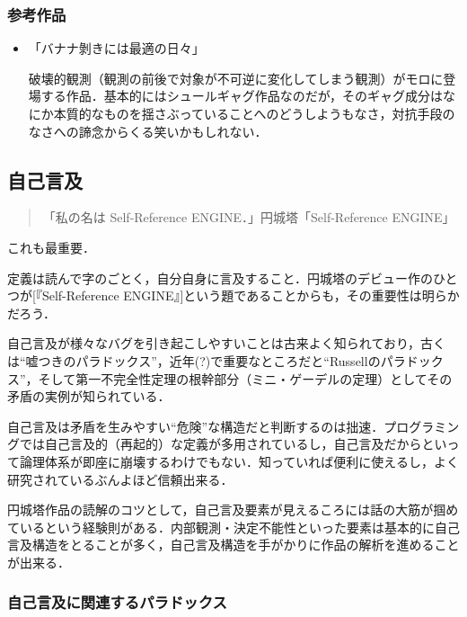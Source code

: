 \documentclass[10pt, a5paper, twoside]{jsarticle}
\begin{document}
			\subsubsection*{参考作品}
			
			\begin{itemize}
				
				\item「バナナ剝きには最適の日々」

					破壊的観測（観測の前後で対象が不可逆に変化してしまう観測）がモロに登場する作品．基本的にはシュールギャグ作品なのだが，そのギャグ成分はなにか本質的なものを揺さぶっていることへのどうしようもなさ，対抗手段のなさへの諦念からくる笑いかもしれない．

			\end{itemize}

		\subsection{自己言及}

			\begin{quote}

				「私の名は Self-Reference ENGINE．」\hspace{\fill}円城塔「Self-Reference ENGINE」

			\end{quote}

			これも最重要．

			定義は読んで字のごとく，自分自身に言及すること．円城塔のデビュー作のひとつが[『Self-Reference ENGINE』]という題であることからも，その重要性は明らかだろう．
			
			自己言及が様々なバグを引き起こしやすいことは古来よく知られており，古くは“嘘つきのパラドックス”，近年(?)で重要なところだと“Russellのパラドックス”，そして第一不完全性定理の根幹部分（ミニ・ゲーデルの定理）としてその矛盾の実例が知られている．

			自己言及は矛盾を生みやすい“危険”な構造だと判断するのは拙速．プログラミングでは自己言及的（再起的）な定義が多用されているし，自己言及だからといって論理体系が即座に崩壊するわけでもない．知っていれば便利に使えるし，よく研究されているぶんよほど信頼出来る．

			円城塔作品の読解のコツとして，自己言及要素が見えるころには話の大筋が掴めているという経験則がある．内部観測・決定不能性といった要素は基本的に自己言及構造をとることが多く，自己言及構造を手がかりに作品の解析を進めることが出来る．

			\subsubsection*{自己言及に関連するパラドックス}
\end{document}
